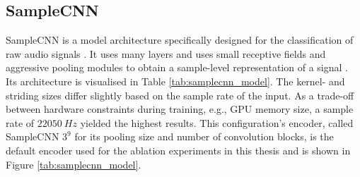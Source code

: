 \subsection{SampleCNN}
SampleCNN is a model architecture specifically designed for the classification of raw audio signals \cite{lee2018samplecnn}. It uses many layers and uses small receptive fields and aggressive pooling modules to obtain a sample-level representation of a signal \cite{lee2018samplecnn}. Its architecture is visualised in Table \ref{tab:samplecnn_model}. The kernel- and striding sizes differ slightly based on the sample rate of the input. As a trade-off between hardware constraints during training, e.g., GPU memory size, a sample rate of $22050~Hz$ yielded the highest results. This configuration's encoder, called SampleCNN $3^9$ for its pooling size and number of convolution blocks, is the default encoder used for the ablation experiments in this thesis and is shown in Figure \ref{tab:samplecnn_model}.


